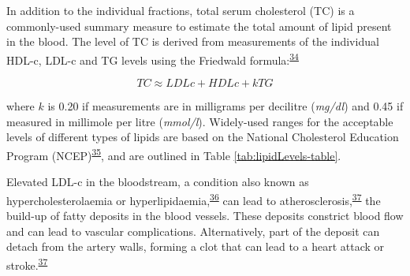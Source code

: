 \documentclass[a4paper, twoside]{templates/ociamthesis}
\begin{document}
In addition to the individual fractions, total serum cholesterol (TC) is a commonly-used summary measure to estimate the total amount of lipid present in the blood. The level of TC is derived from measurements of the individual HDL-c, LDL-c and TG levels using the Friedwald formula:\textsuperscript{\protect\hyperlink{ref-friedewald1972}{34}}

\begin{equation}
  TC \approx LDLc + HDLc + kTG
  \label{eq:total-cholesterol-formula}
\end{equation}

where \(k\) is 0.20 if measurements are in milligrams per decilitre (\emph{mg/dl}) and 0.45 if measured in millimole per litre (\emph{mmol/l}). Widely-used ranges for the acceptable levels of different types of lipids are based on the National Cholesterol Education Program (NCEP)\textsuperscript{\protect\hyperlink{ref-national2002third}{35}}, and are outlined in Table \ref{tab:lipidLevels-table}.

Elevated LDL-c in the bloodstream, a condition also known as hypercholesterolaemia or hyperlipidaemia,\textsuperscript{\protect\hyperlink{ref-nelson2013}{36}} can lead to atherosclerosis,\textsuperscript{\protect\hyperlink{ref-libby2019}{37}} the build-up of fatty deposits in the blood vessels. These deposits constrict blood flow and can lead to vascular complications. Alternatively, part of the deposit can detach from the artery walls, forming a clot that can lead to a heart attack or stroke.\textsuperscript{\protect\hyperlink{ref-libby2019}{37}}

~
\end{document}
